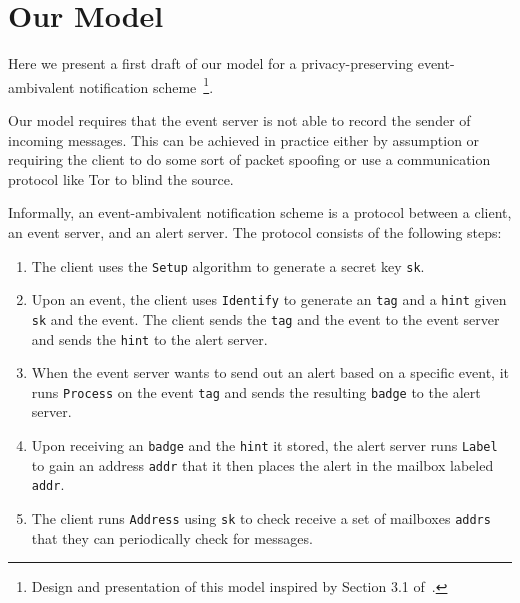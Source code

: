 \section{Our Model}

Here we present a first draft of our model for a privacy-preserving
event-ambivalent notification scheme~\footnote{Design and presentation of this
model inspired by Section 3.1 of~\cite{CK:eurocrypt20}.}.\par

Our model requires that the event server is not able to record the sender of
incoming messages. This can be achieved in practice either by assumption or
requiring the client to do some sort of packet spoofing or use a communication
protocol like Tor to blind the source.

Informally, an event-ambivalent notification scheme is a protocol between a
client, an event server, and an alert server. The protocol consists of the
following steps:\par

\begin{enumerate}
  \item The client uses the \texttt{Setup} algorithm to generate a secret key
    \texttt{sk}.
  \item Upon an event, the client uses \texttt{Identify} to generate an
    \texttt{tag} and a \texttt{hint} given \texttt{sk} and the event. The client
    sends the \texttt{tag} and the event to the event server and sends the
    \texttt{hint} to the alert server.
  \item When the event server wants to send out an alert based on a specific
    event, it runs \texttt{Process} on the event \texttt{tag} and sends the 
    resulting \texttt{badge} to the alert server.
  \item Upon receiving an \texttt{badge} and the \texttt{hint} it stored, the
    alert server runs \texttt{Label} to gain an address \texttt{addr} that it
    then places the alert in the mailbox labeled \texttt{addr}.
  \item The client runs \texttt{Address} using \texttt{sk} to check receive a
    set of mailboxes \texttt{addrs} that they can periodically check for
    messages.
\end{enumerate}

